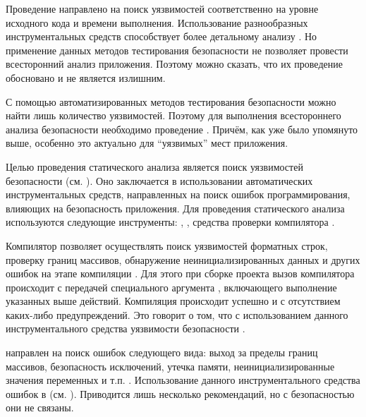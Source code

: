 %
Проведение  направлено на поиск уязвимостей соответственно на уровне исходного кода и времени выполнения. 
%
Использование разнообразных инструментальных средств способствует более детальному анализу . 
%
Но применение данных методов тестирования безопасности не позволяет провести всесторонний анализ приложения. 
%
Поэтому можно сказать, что их проведение обосновано и не является излишним.

%
С помощью автоматизированных методов тестирования безопасности можно найти лишь  количество уязвимостей. 
%
Поэтому для выполнения всестороннего анализа безопасности  необходимо проведение . 
%
Причём, как уже было упомянуто выше, особенно это актуально для ``уязвимых'' мест приложения. 



%
Целью проведения статического анализа является поиск уязвимостей безопасности  (см. ). 
%
Оно заключается в использовании автоматических инструментальных средств, направленных на поиск ошибок программирования, влияющих на безопасность приложения. 
%
Для проведения статического анализа  используются следующие инструменты: , , средства проверки компилятора . 

%
Компилятор  позволяет осуществлять поиск уязвимостей форматных строк, проверку границ массивов, обнаружение неинициализированных данных и других ошибок на этапе компиляции . 
%
Для этого при сборке проекта вызов компилятора происходит с передачей специального аргумента , включающего выполнение указанных выше действий. 
%
Компиляция  происходит успешно и с отсутствием каких-либо предупреждений. 
%
Это говорит о том, что с использованием данного инструментального средства уязвимости безопасности . 

%
 направлен на поиск ошибок следующего вида: выход за пределы границ массивов, безопасность исключений, утечка памяти, неинициализированные значения переменных и т.п. . 
%
Использование данного инструментального средства ошибок в   (см. ). 
%
Приводится лишь несколько рекомендаций, но с безопасностью они не связаны. 


